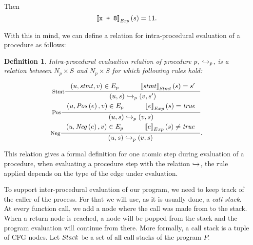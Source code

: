 \documentclass[..thesis.tex]{subfiles}
\newtheorem{defin}{Definition}[section]
\begin{document}
Then 
\begin{equation*}
\left\llbracket \text{\texttt{x + 8}} \right\rrbracket_{\mathit{Exp}} \left( s \right) = 11 \text{.}    
\end{equation*}

With this in mind, we can define a relation for intra-procedural evaluation of a procedure as follows:

\begin{defin}
Intra-procedural evaluation relation of procedure $p$, $\hookrightarrow_p$,
is a relation between $N_p \times S$ and $N_p \times S$ for which following rules hold:

\addtolength{\jot}{2em}
\begin{gather*}
  \inference[Stmt]{ \lp u, \mathword{stmt}, v \rp \in E_{p}  \separ  \lllb \mathword{stmt} \rrrb_{\mathword{Stmt}} \lp s \rp = s'}{\lp u, s \rp \intraproc_p \lp v, s' \rp} \\
  \inference[Pos]{ \lp u, \mathword{Pos} \lp e \rp , v \rp \in E_{p} \separ \lllb e \rrrb_{Exp} \lp s \rp = \mathword{true} }{\lp u, s \rp \intraproc_p \lp v, s \rp} \\  
  \inference[Neg]{ \lp u, \mathword{Neg} \lp e \rp , v \rp \in E_{p} \separ \lllb e \rrrb_{Exp} \lp s \rp \neq \mathword{true} }{\lp u, s \rp \intraproc_p \lp v, s \rp}  \text{.}
\end{gather*}
\addtolength{\jot}{-2em}

\end{defin}


This relation gives a formal definition for one atomic step during evaluation of a procedure, when evaluating a procedure step with the relation $\hookrightarrow$,
the rule applied depends on the type of the edge under evaluation. 


To support inter-procedural evaluation of our program, we need to keep track of the caller of the process. For that we will use, as it is usually done, a \textit{call stack}.
At every function call, we add a node where the call was made from to the stack. When a return node is reached,
a node will be popped from the stack and the program evaluation will continue from there.
More formally, a call stack is a tuple of CFG nodes. Let $\mathit{Stack}$ be a set of all call stacks of the program $P$. 
\end{document}

